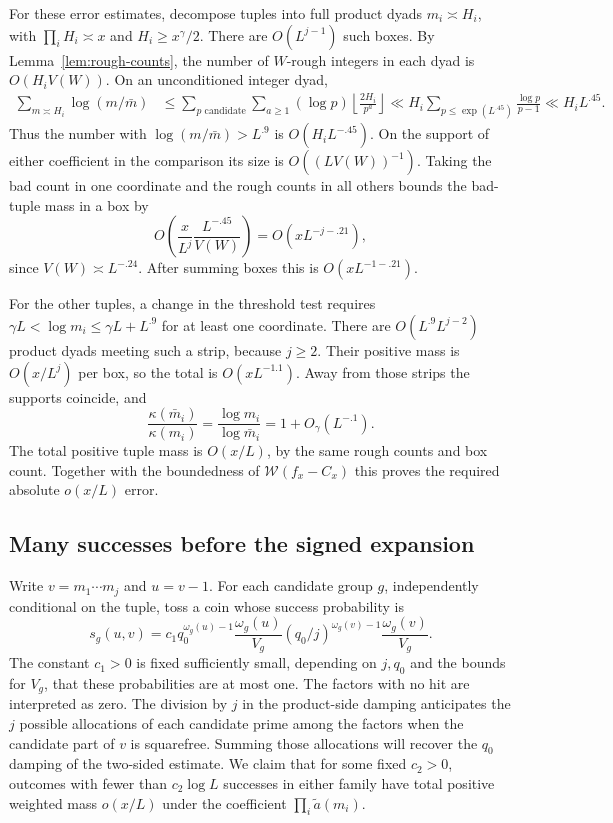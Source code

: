 For these error estimates, decompose tuples into full product
dyads $m_i\asymp H_i$, with $\prod_iH_i\asymp x$ and
$H_i\geq x^\gamma/2$.  There are $O(L^{j-1})$ such boxes.
By Lemma~\ref{lem:rough-counts}, the number of $W$-rough
integers in each dyad is $O(H_iV(W))$.  On an unconditioned
integer dyad,
\begin{align}\label{ext:removed-log-mean}
 \sum_{m\asymp H_i}\log(m/\bar m)
 &\leq\sum_{p\text{ candidate}}\sum_{a\geq1}
                   (\log p)\left\lfloor\frac{2H_i}{p^a}\right\rfloor
 \ll H_i\sum_{p\leq\exp(L^{.45})}\frac{\log p}{p-1}
 \ll H_iL^{.45}.
\end{align}
Thus the number with $\log(m/\bar m)>L^{.9}$ is
$O(H_iL^{-.45})$.  On the support of either coefficient in the
comparison its size is $O((LV(W))^{-1})$.  Taking the bad count
in one coordinate and the rough counts in all others bounds the
bad-tuple mass in a box by
\begin{equation}\label{ext:large-removal-error}
 O\left(\frac{x}{L^j}\frac{L^{-.45}}{V(W)}\right)
 =O(xL^{-j-.21}),
\end{equation}
since $V(W)\asymp L^{-.24}$.  After summing boxes this is
$O(xL^{-1-.21})$.

For the other tuples, a change in the threshold test requires
$\gamma L<\log m_i\leq\gamma L+L^{.9}$ for at least one
coordinate.  There are
$O(L^{.9}L^{j-2})$ product dyads meeting such a strip, because
$j\geq2$.  Their positive mass is $O(x/L^j)$ per box, so the
total is $O(xL^{-1.1})$.  Away from those strips the supports
coincide, and
\[
 \frac{\kappa(\bar m_i)}{\kappa(m_i)}
 =\frac{\log m_i}{\log\bar m_i}=1+O_\gamma(L^{-.1}).
\]
The total positive tuple mass is $O(x/L)$, by the same rough
counts and box count.  Together with the boundedness of
$\mathcal W(f_x-C_x)$ this proves the required absolute
$o(x/L)$ error.

\subsection{Many successes before the signed expansion}

Write $v=m_1\cdots m_j$ and $u=v-1$.  For each candidate group
$g$, independently conditional on the tuple, toss a coin whose
success probability is
\begin{equation}\label{ext:success-probability}
 s_g(u,v)=c_1q_0^{\omega_g(u)-1}\frac{\omega_g(u)}{V_g}
       (q_0/j)^{\omega_g(v)-1}\frac{\omega_g(v)}{V_g}.
\end{equation}
The constant $c_1>0$ is fixed sufficiently small, depending on
$j,q_0$ and the bounds for $V_g$, that these probabilities are at
most one.  The factors with no hit are interpreted as zero.
The division by $j$ in the product-side damping anticipates the $j$
possible allocations of each candidate prime among the factors when
the candidate part of $v$ is squarefree.  Summing those allocations
will recover the $q_0$ damping of the two-sided estimate.
We claim that for some fixed $c_2>0$, outcomes with fewer than
$c_2\log L$ successes in either family have total positive
weighted mass $o(x/L)$ under the coefficient
$\prod_i\widetilde a(m_i)$.

